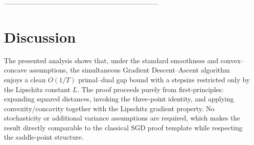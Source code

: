 \documentclass{article}
\begin{document}
--------------------------------------------------------------------
\section*{Discussion}
The presented analysis shows that, under the standard smoothness and
convex–concave assumptions, the simultaneous Gradient Descent–Ascent
algorithm enjoys a clean $O(1/T)$ primal–dual gap bound with a stepsize
restricted only by the Lipschitz constant $L$.  The proof proceeds
purely from first‑principles: expanding squared distances, invoking the
three‑point identity, and applying convexity/concavity together with the
Lipschitz gradient property.  No stochasticity or additional variance
assumptions are required, which makes the result directly comparable to
the classical SGD proof template while respecting the saddle‑point
structure.
\end{document}
